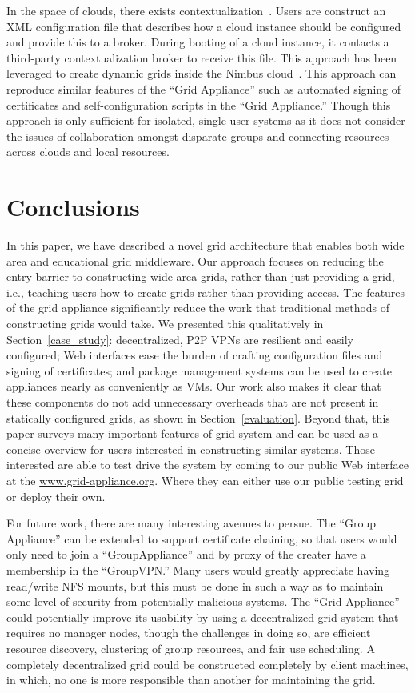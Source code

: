 \documentclass[conference]{IEEEtran}
\begin{document}
In the space of clouds, there exists contextualization~\cite{context}.  Users
are construct an XML configuration file that describes how a cloud instance
should be configured and provide this to a broker.  During booting of a cloud
instance, it contacts a third-party contextualization broker to receive this
file.  This approach has been leveraged to create dynamic grids inside the
Nimbus cloud~\cite{alien_grid}.  This approach can reproduce similar features
of the ``Grid Appliance'' such as automated signing of certificates and
self-configuration scripts in the ``Grid Appliance.'' Though this approach is
only sufficient for isolated, single user systems as it does not consider the
issues of collaboration amongst disparate groups and connecting resources
across clouds and local resources.

\section{Conclusions}
\label{conclusions}

In this paper, we have described a novel grid architecture that enables both
wide area and educational grid middleware.  Our approach focuses on reducing
the entry barrier to constructing wide-area grids, rather than just providing a
grid, i.e., teaching users how to create grids rather than providing access.
The features of the grid appliance significantly reduce the work that
traditional methods of constructing grids would take.  We presented this
qualitatively in Section~\ref{case_study}:  decentralized, P2P VPNs are
resilient and easily configured; Web interfaces ease the burden of crafting
configuration files and signing of certificates; and package management systems
can be used to create appliances nearly as conveniently as VMs.  Our work also
makes it clear that these components do not add unnecessary overheads that are
not present in statically configured grids, as shown in
Section~\ref{evaluation}.  Beyond that, this paper surveys many important
features of grid system and can be used as a concise overview for users
interested in constructing similar systems.  Those interested are able to test
drive the system by coming to our public Web interface at the
\url{www.grid-appliance.org}.  Where they can either use our public testing
grid or deploy their own.

For future work, there are many interesting avenues to persue.  The ``Group
Appliance'' can be extended to support certificate chaining, so that users
would only need to join a ``GroupAppliance'' and by proxy of the creater have
a membership in the ``GroupVPN.''  Many users would greatly appreciate having
read/write NFS mounts, but this must be done in such a way as to maintain some
level of security from potentially malicious systems.  The ``Grid Appliance''
could potentially improve its usability by using a decentralized grid system
that requires no manager nodes, though the challenges in doing so, are
efficient resource discovery, clustering of group resources, and fair use
scheduling.  A completely decentralized grid could be constructed completely by
client machines, in which, no one is more responsible than another for
maintaining the grid.
\end{document}
